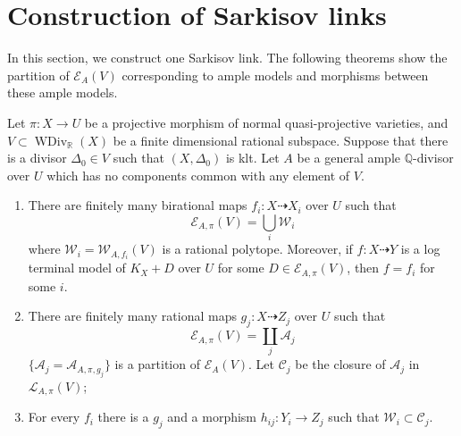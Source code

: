 \section{Construction of Sarkisov links}
In this section, we construct one Sarkisov link. The following theorems show the partition of $\mathcal{E}_{A}(V)$  corresponding to ample models and morphisms between these ample models.
\begin{theorem}\label{finitemodel}
  \cite[Corollary 1.1.5]{BCHM10} Let $\pi:X\to U$ be a projective morphism of normal quasi-projective varieties,  and $V \subset \operatorname{WDiv}_{\mathbb{R}}(X)$ be a finite dimensional rational subspace. Suppose that there is a divisor $\Delta_{0} \in V$ such that $(X,\Delta_{0})$ is klt. Let $A$ be a general ample $\mathbb{Q}$-divisor over $U$ which has no components common with any element of $V$.
  \begin{enumerate}
    \item   There are finitely many birational maps $f_{i}:X \dashrightarrow   X_{i}$ over $U$ such that
          \[
            \mathcal{E}_{A,\pi}(V) =\bigcup_{i}\mathcal{W}_{i}
          \]
          where  $\mathcal{W}_{i}=\mathcal{W}_{A,f_{i}}(V)$ is a rational polytope. Moreover, if  $f:X \dashrightarrow  Y$ is a  log terminal model of $K_{X}+D$ over $U$ for some $D \in \mathcal{E}_{A,\pi}(V)$, then  $f=f_{i}$ for some $i$.

    \item   There are finitely many rational maps $g_{j}:X \dashrightarrow  Z_{j}$ over $U$ such that
          \[
            \mathcal{E}_{A,\pi}(V) =\coprod_{j}\mathcal{A}_{j}
          \]
          $ \{\mathcal{A}_j=\mathcal{A}_{A,\pi,g_j}\} $ is a partition of $ \mathcal{E}_{A}(V) $. Let $\mathcal{C}_{j}$ be the closure of $\mathcal{A}_{j}$ in $\mathcal{L}_{A,\pi}(V)$;
    \item  For every  $f_{i}$ there is a $g_{j}$ and a morphism $h_{ij}:Y_{i}\to Z_{j}$ such that $\mathcal{W}_{i} \subset \mathcal{C}_{j}$.
  \end{enumerate}
\end{theorem}

